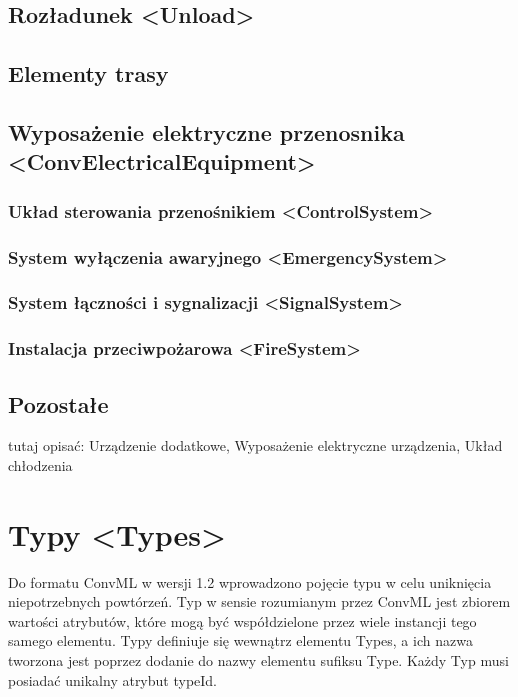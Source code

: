\documentclass[12pt,a4paper]{article}
\begin{document}
\subsection{Rozładunek <Unload>}


\subsection{Elementy trasy}


\subsection{Wyposażenie elektryczne przenosnika <ConvElectricalEquipment>}


\subsubsection{Układ sterowania przenośnikiem <ControlSystem>}


\subsubsection{System wyłączenia awaryjnego <EmergencySystem>}


\subsubsection{System łączności i sygnalizacji <SignalSystem>}


\subsubsection{Instalacja przeciwpożarowa <FireSystem>}


\subsection{Pozostałe}
tutaj opisać: Urządzenie dodatkowe, Wyposażenie elektryczne urządzenia, Układ
chłodzenia


\section{Typy <Types>}
Do formatu ConvML w wersji 1.2 wprowadzono pojęcie typu w celu uniknięcia
niepotrzebnych powtórzeń.  Typ w sensie rozumianym przez ConvML jest zbiorem
wartości atrybutów, które mogą być współdzielone przez wiele instancji tego
samego elementu.  Typy definiuje się wewnątrz elementu Types, a ich nazwa
tworzona jest poprzez dodanie do nazwy elementu sufiksu Type. Każdy Typ musi
posiadać unikalny atrybut typeId.
\end{document}
